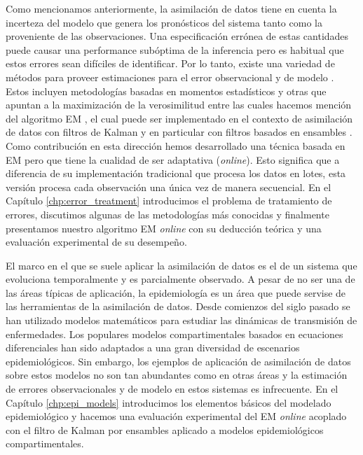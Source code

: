 Como mencionamos anteriormente, la asimilación de datos tiene en cuenta la incerteza del modelo que genera los pronósticos del sistema tanto como la proveniente de las observaciones. Una especificación errónea de estas cantidades puede causar una performance subóptima de la inferencia pero es habitual que estos errores sean difíciles de identificar. Por lo tanto, existe una variedad de métodos para proveer estimaciones para el error observacional y de modelo \citep{Tandeo2020}. Estos incluyen metodologías basadas en momentos estadísticos y otras que apuntan a la maximización de la verosimilitud entre las cuales hacemos mención del algoritmo EM \citep{Dempster1977}, el cual puede ser implementado en el contexto de asimilación de datos con filtros de Kalman y en particular con filtros basados en ensambles \citep{Tandeo2015}. Como contribución en esta dirección hemos desarrollado una técnica basada en EM pero que tiene la cualidad de ser adaptativa (\textit{online}). Esto significa que a diferencia de su implementación tradicional que procesa los datos en lotes, esta versión procesa cada observación una única vez de manera secuencial. En el Capítulo \ref{chp:error_treatment} introducimos el problema de tratamiento de errores, discutimos algunas de las metodologías más conocidas y finalmente presentamos nuestro algoritmo EM \textit{online} con su deducción teórica y una evaluación experimental de su desempeño.

El marco en el que se suele aplicar la asimilación de datos es el de un sistema que evoluciona temporalmente y es parcialmente observado. A pesar de no ser una de las áreas típicas de aplicación, la epidemiología es un área que puede servise de las herramientas de la asimilación de datos. Desde comienzos del siglo pasado se han utilizado modelos matemáticos para estudiar las dinámicas de transmisión de enfermedades. Los populares modelos compartimentales basados en ecuaciones diferenciales \citep{Kermack1927} han sido adaptados a una gran diversidad de escenarios epidemiológicos. Sin embargo, los ejemplos de aplicación de asimilación de datos sobre estos modelos no son tan abundantes como en otras áreas y la estimación de errores observacionales y de modelo en estos sistemas es infrecuente. En el Capítulo \ref{chp:epi_models} introducimos los elementos básicos del modelado epidemiológico y hacemos una evaluación experimental del EM \textit{online} acoplado con el filtro de Kalman por ensambles aplicado a modelos epidemiológicos compartimentales.

